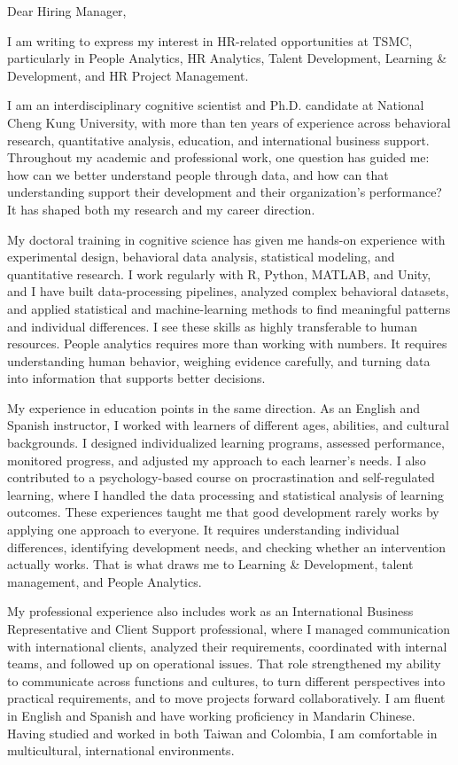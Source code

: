 \documentclass[10.5pt]{article}
\begin{document}
Dear Hiring Manager,

I am writing to express my interest in HR-related opportunities at TSMC, particularly in People Analytics, HR Analytics, Talent Development, Learning \& Development, and HR Project Management.

I am an interdisciplinary cognitive scientist and Ph.D. candidate at National Cheng Kung University, with more than ten years of experience across behavioral research, quantitative analysis, education, and international business support. Throughout my academic and professional work, one question has guided me: how can we better understand people through data, and how can that understanding support their development and their organization's performance? It has shaped both my research and my career direction.

My doctoral training in cognitive science has given me hands-on experience with experimental design, behavioral data analysis, statistical modeling, and quantitative research. I work regularly with R, Python, MATLAB, and Unity, and I have built data-processing pipelines, analyzed complex behavioral datasets, and applied statistical and machine-learning methods to find meaningful patterns and individual differences. I see these skills as highly transferable to human resources. People analytics requires more than working with numbers. It requires understanding human behavior, weighing evidence carefully, and turning data into information that supports better decisions.

My experience in education points in the same direction. As an English and Spanish instructor, I worked with learners of different ages, abilities, and cultural backgrounds. I designed individualized learning programs, assessed performance, monitored progress, and adjusted my approach to each learner's needs. I also contributed to a psychology-based course on procrastination and self-regulated learning, where I handled the data processing and statistical analysis of learning outcomes. These experiences taught me that good development rarely works by applying one approach to everyone. It requires understanding individual differences, identifying development needs, and checking whether an intervention actually works. That is what draws me to Learning \& Development, talent management, and People Analytics.

My professional experience also includes work as an International Business Representative and Client Support professional, where I managed communication with international clients, analyzed their requirements, coordinated with internal teams, and followed up on operational issues. That role strengthened my ability to communicate across functions and cultures, to turn different perspectives into practical requirements, and to move projects forward collaboratively. I am fluent in English and Spanish and have working proficiency in Mandarin Chinese. Having studied and worked in both Taiwan and Colombia, I am comfortable in multicultural, international environments.
\end{document}
